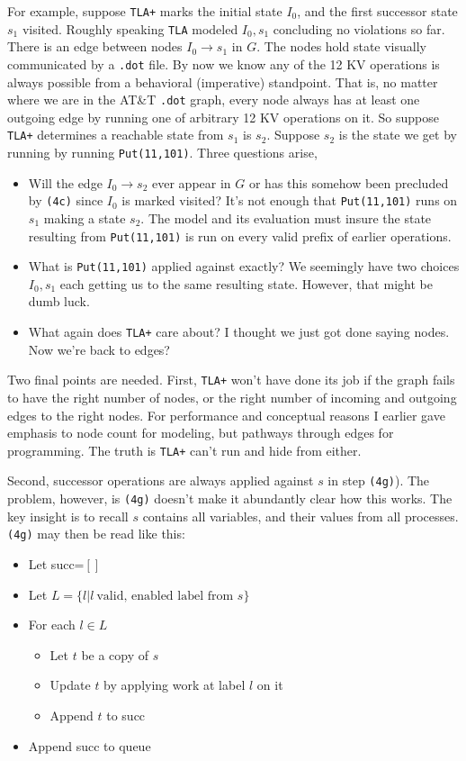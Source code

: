 \documentclass[twocolumn]{article}
\begin{document}
For example, suppose \texttt{TLA+} marks the initial state $I_0$, and the first successor state $s_1$ visited. Roughly speaking \texttt{TLA} modeled $I_0, s_1$ concluding no violations so far. There is an edge between nodes $I_0 \rightarrow s_1$ in $G$. The nodes hold state visually communicated by a \texttt{.dot} file. By now we know any of the 12 KV operations is always possible from a behavioral (imperative) standpoint. That is, no matter where we are in the AT\&T \texttt{.dot} graph, every node always has at least one outgoing edge by running one of arbitrary 12 KV operations on it. So suppose \texttt{TLA+} determines a reachable state from $s_1$ is $s_2$. Suppose $s_2$ is the state we get by running by running \texttt{Put(11,101)}. Three questions arise,

\begin{itemize}
\item Will the edge $I_0 \rightarrow s_2$ ever appear in $G$ or has this somehow been precluded by \texttt{(4c)} since $I_0$ is marked visited? It's not enough that \texttt{Put(11,101)} runs on $s_1$ making a state $s_2$. The model and its evaluation must insure the state resulting from \texttt{Put(11,101)} is run on every valid prefix of earlier operations.
\item What is \texttt{Put(11,101)} applied against exactly? We seemingly have two choices $I_0, s_1$ each getting us to the same resulting state. However, that might be dumb luck.
\item What again does \texttt{TLA+} care about? I thought we just got done saying nodes. Now we're back to edges?
\end{itemize}

Two final points are needed. First, \texttt{TLA+} won't have done its job if the graph fails to have the right number of nodes, or the right number of incoming and outgoing edges to the right nodes. For performance and conceptual reasons I earlier gave emphasis to node count for modeling, but pathways through edges for programming. The truth is \texttt{TLA+} can't run and hide from either. 

Second, successor operations are always applied against $s$ in step \texttt{(4g)}). The problem, however, is \texttt{(4g)} doesn't make it abundantly clear how this works. The key insight is to recall $s$ contains all variables, and their values from all processes. \texttt{(4g)} may then be read like this:

\begin{itemize}
\item Let succ=$[]$
\item Let $L=\{l|l\ \text{valid, enabled label from\ } s\}$
\item For each $l \in L$
	\begin{itemize}
	\item Let $t$ be a copy of $s$
	\item Update $t$ by applying work at label $l$ on it
	\item Append $t$ to succ
	\end{itemize}
	\item Append succ to queue
\end{itemize}
\end{document}
